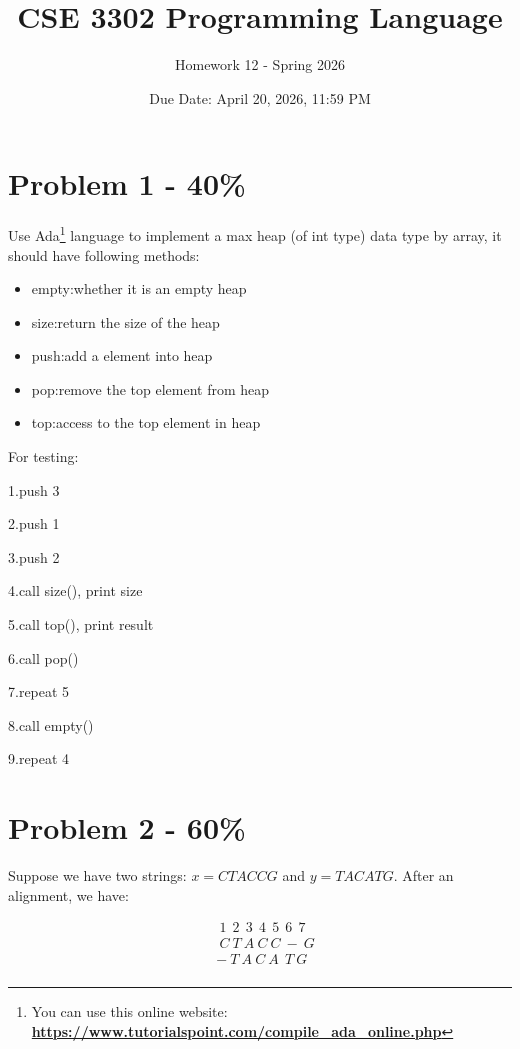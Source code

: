 \documentclass{article}
\begin{document}
\title{CSE 3302 Programming Language}
\author{Homework 12 - Spring 2026}
\date{Due Date: April 20, 2026, 11:59 PM}
\maketitle
\thispagestyle{fancy}


\section*{Problem 1 - 40\%}

Use Ada\footnote{You can use this online website: \href{https://www.tutorialspoint.com/compile_ada_online.php}{\textbf{https://www.tutorialspoint.com/compile\_ada\_online.php}}} language to implement a max heap (of int type) data type by array, it should have following methods:
\begin{itemize}
    \item empty:whether it is an empty heap
    \item size:return the size of the heap
    \item push:add a element into heap
    \item pop:remove the top element from heap
    \item top:access to the top element in heap
\end{itemize}
For testing: 

1.push 3

2.push 1

3.push 2

4.call size(), print size

5.call top(), print result

6.call pop()

7.repeat 5

8.call empty()

9.repeat 4


\section*{Problem 2 - 60\%}

Suppose we have two strings: $x=CTACCG$ and $y=TACATG$. After an alignment, we have:

\begin{align*}
    &\ 1\ \ 2\ \ 3\ \ 4\ \ 5\ \ 6\ \ 7\\
    &\ C\ T\ A\ C\ C\ -\ G\\
    &-\ T\ A\ C\ A\ \ T\ G\\
\end{align*}
\end{document}
